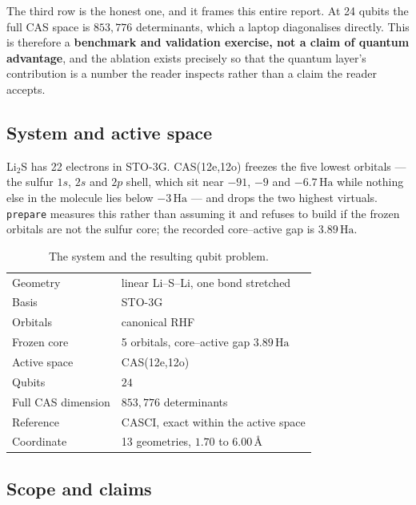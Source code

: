 \documentclass[11pt,a4paper]{article}
\newcommand{\Ha}{\ensuremath{\,\mathrm{Ha}}}
\newcommand{\Ang}{\ensuremath{\,\text{\AA}}}
\newcommand{\code}[1]{\texttt{\small #1}}
\begin{document}
The third row is the honest one, and it frames this entire report. At 24 qubits
the full CAS space is $853{,}776$ determinants, which a laptop diagonalises
directly. This is therefore a \textbf{benchmark and validation exercise, not a
claim of quantum advantage}, and the ablation exists precisely so that the
quantum layer's contribution is a number the reader inspects rather than a claim
the reader accepts.

\subsection{System and active space}

Li$_2$S has 22 electrons in STO-3G. CAS(12e,12o) freezes the five lowest
orbitals --- the sulfur $1s$, $2s$ and $2p$ shell, which sit near $-91$, $-9$
and $-6.7\Ha$ while nothing else in the molecule lies below $-3\Ha$ --- and
drops the two highest virtuals. \code{prepare} measures this rather than
assuming it and refuses to build if the frozen orbitals are not the sulfur
core; the recorded core--active gap is $3.89\Ha$.

\begin{table}[htbp]
\centering
\caption{The system and the resulting qubit problem.}
\label{tab:system}
\small
\begin{tabular}{ll}
\toprule
Geometry            & linear Li--S--Li, one bond stretched \\
Basis               & STO-3G \\
Orbitals            & canonical RHF \\
Frozen core         & 5 orbitals, core--active gap $3.89\Ha$ \\
Active space        & CAS(12e,12o) \\
Qubits              & $24$ \\
Full CAS dimension  & $853{,}776$ determinants \\
Reference           & CASCI, exact within the active space \\
Coordinate          & 13 geometries, $1.70$ to $6.00\Ang$ \\
\bottomrule
\end{tabular}
\end{table}

\subsection{Scope and claims}
\end{document}
